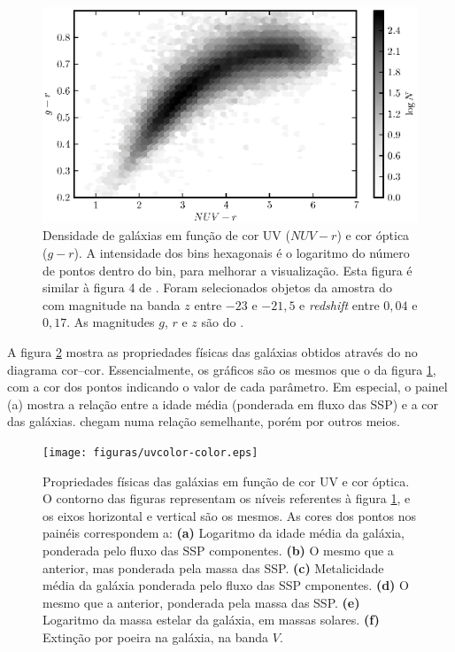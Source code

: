 \begin{figure}
	\includegraphics{figuras/uvcolor-color-density.eps}
	\caption[Densidade de galáxias no diagrama cor--cor UV.]
	{Densidade de galáxias em função de cor UV ($NUV-r$) e cor óptica ($g-r$). A
	intensidade dos bins hexagonais é o logaritmo do número de pontos dentro do
	bin, para melhorar a visualização. Esta figura é similar à figura 4 de
	\citet{Chilingarian2011}. Foram selecionados objetos da amostra do \starlight
	com magnitude na banda $z$ entre $-23$ e $-21,5$ e {\em redshift} entre $0,04$
	e $0,17$. As magnitudes $g$, $r$ e $z$ são do \SDSS.}
	\label{fig:DensityColor}
\end{figure}

A figura \ref{fig:ColorStarlightParam} mostra as propriedades físicas das
galáxias obtidos através do \starlight no diagrama cor--cor. Essencialmente, os
gráficos são os mesmos que o da figura \ref{fig:DensityColor}, com a cor dos
pontos indicando o valor de cada parâmetro. Em especial, o painel (a) mostra a
relação entre a idade média (ponderada em fluxo das SSP) e a cor das galáxias.
\citeauthor{Chilingarian2011} chegam numa relação semelhante, porém por outros
meios.

\begin{figure}
	\texttt{[image: figuras/uvcolor-color.eps]}
	\caption[Diagrama cor--cor UV para os diversos parâmetros \starlight.]
	{Propriedades físicas das galáxias em função de cor UV e cor óptica. O contorno
	das figuras representam os níveis referentes à figura \ref{fig:DensityColor},
	e os eixos horizontal e vertical são os mesmos. As cores dos pontos nos painéis
	correspondem a: \textbf{(a)} Logaritmo da idade média da galáxia, ponderada
	pelo fluxo das SSP componentes. \textbf{(b)} O mesmo que a anterior, mas
	ponderada pela massa das SSP. \textbf{(c)} Metalicidade média da galáxia
	ponderada pelo fluxo das SSP cmponentes. \textbf{(d)} O mesmo que a
	anterior, ponderada pela massa das SSP. \textbf{(e)} Logaritmo da massa
	estelar da galáxia, em massas solares. \textbf{(f)} Extinção por poeira na
	galáxia, na banda $V$.}
	\label{fig:ColorStarlightParam}
\end{figure}


